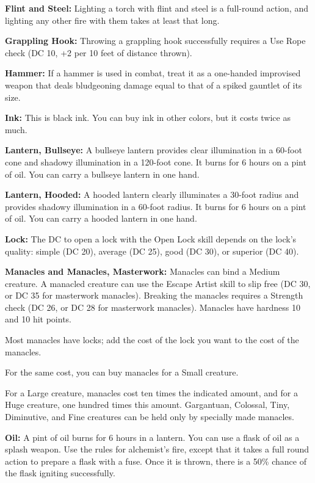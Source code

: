 \begin{multicols}{2}
\textbf{Flint and Steel:} Lighting a torch with flint and steel is a full-round 
action, and lighting any other fire with them takes at least that long.

\textbf{Grappling Hook:} Throwing a grappling hook successfully requires a Use 
Rope check (DC 10, +2 per 10 feet of distance thrown).

\textbf{Hammer:} If a hammer is used in combat, treat it as a one-handed improvised 
weapon that deals bludgeoning damage equal to that of a spiked gauntlet of its 
size.

\textbf{Ink:} This is black ink. You can buy ink in other colors, but it costs 
twice as much.

\textbf{Lantern, Bullseye:} A bullseye lantern provides clear illumination in a 
60-foot cone and shadowy illumination in a 120-foot cone. It burns for 6 hours 
on a pint of oil. You can carry a bullseye lantern in one hand.

\textbf{Lantern, Hooded:} A hooded lantern clearly illuminates a 30-foot radius 
and provides shadowy illumination in a 60-foot radius. It burns for 6 hours on 
a pint of oil. You can carry a hooded lantern in one hand.

\textbf{Lock:} The DC to open a lock with the Open Lock skill depends on the lock's 
quality: simple (DC 20), average (DC 25), good (DC 30), or superior (DC 40).

\textbf{Manacles and Manacles, Masterwork:} Manacles can bind a Medium creature. 
A manacled creature can use the Escape Artist skill to slip free (DC 30, or DC 
35 for masterwork manacles). Breaking the manacles requires a Strength check (DC 
26, or DC 28 for masterwork manacles). Manacles have hardness 10 and 10 hit points.

Most manacles have locks; add the cost of the lock you want to the cost of the 
manacles.

For the same cost, you can buy manacles for a Small creature.

For a Large creature, manacles cost ten times the indicated amount, and for a Huge 
creature, one hundred times this amount. Gargantuan, Colossal, Tiny, Diminutive, 
and Fine creatures can be held only by specially made manacles.

\textbf{Oil:} A pint of oil burns for 6 hours in a lantern. You can use a flask 
of oil as a splash weapon. Use the rules for alchemist's fire, except that it takes 
a full round action to prepare a flask with a fuse. Once it is thrown, there is 
a 50\% chance of the flask igniting successfully.


\end{multicols}
